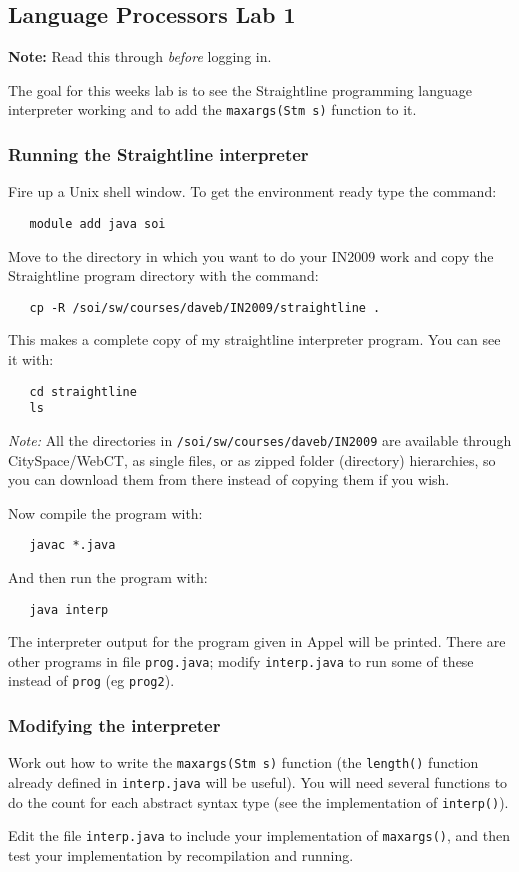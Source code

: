 \documentclass{article}
\begin{document}
\subsection*{Language Processors Lab 1}

{\bf Note:} Read this through {\em before\/} logging in.

\medskip\noindent The goal for this weeks 
lab is to see the Straightline programming language interpreter working
and to add the {\tt maxargs(Stm s)} function to it. 

\subsubsection*{Running the Straightline interpreter}

Fire up a Unix shell window. 
To get the environment ready type the command:
\begin{verbatim}
   module add java soi 
\end{verbatim}
Move to the directory in which you want to do
your IN2009 work and copy the Straightline program directory
with the command:
\begin{verbatim}
   cp -R /soi/sw/courses/daveb/IN2009/straightline .
\end{verbatim}
This makes a complete copy of my straightline interpreter program. 
You can see it with:
\begin{verbatim}
   cd straightline
   ls
\end{verbatim}
{\em Note: \/}All the directories in \verb+/soi/sw/courses/daveb/IN2009+ are
available through CitySpace/WebCT, as single files,
or as zipped folder (directory) hierarchies, so you can download them from 
there instead of copying them if you wish.

Now compile the program with:
\begin{verbatim}
   javac *.java
\end{verbatim}
And then run the program with:
\begin{verbatim}
   java interp
\end{verbatim}
The interpreter output for the program given
in Appel will be printed.
There are other programs in file \verb+prog.java+;
modify \verb+interp.java+ to run some of these
instead of \verb+prog+ (eg \verb+prog2+).

\subsubsection*{Modifying the interpreter}

Work out how to write the \verb+maxargs(Stm s)+
function (the \verb+length()+ function already
defined in \verb+interp.java+ will be useful).
You will need several functions to do the count for
each abstract syntax type (see the implementation
of \verb+interp()+).

Edit the file \verb+interp.java+ to include your 
implementation of \verb+maxargs()+, and then
test your implementation by recompilation and
running.
\end{document}
